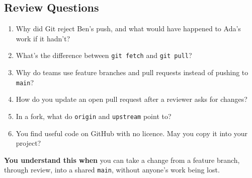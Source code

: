 \subsection*{Review Questions}\label{11-lab-work-on-a-project-with-someone-else:review-questions}

\begin{enumerate}
\def\labelenumi{\arabic{enumi}.}
\tightlist
\item
  Why did Git reject Ben's push, and what would have happened to Ada's work if it hadn't?
\item
  What's the difference between \texttt{git\ fetch} and \texttt{git\ pull}?
\item
  Why do teams use feature branches and pull requests instead of pushing to \texttt{main}?
\item
  How do you update an open pull request after a reviewer asks for changes?
\item
  In a fork, what do \texttt{origin} and \texttt{upstream} point to?
\item
  You find useful code on GitHub with no licence. May you copy it into your project?
\end{enumerate}

\begin{understandbox}

\textbf{You understand this when} you can take a change from a feature branch, through review, into a shared \texttt{main}, without anyone's work being lost.

\end{understandbox}
